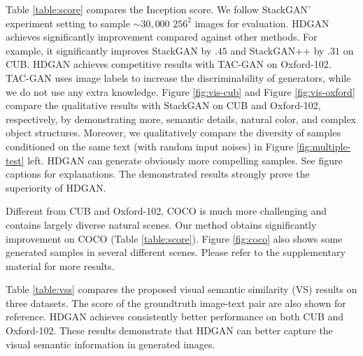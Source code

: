 \documentclass[10pt,twocolumn,letterpaper]{article}
\begin{document}
Table \ref{table:score} compares the Inception score. We follow StackGAN' experiment setting to sample ${\sim}30,000$ $256^2$ images for evaluation.
HDGAN achieves significantly improvement compared against other methods. For example, it significantly improves StackGAN by $.45$ and StackGAN++ by $.31$ on CUB.
HDGAN achieves competitive results with TAC-GAN on Oxford-102. TAC-GAN uses image labels to increase the discriminability of generators, while we do not use any extra knowledge. Figure \ref{fig:vis-cub} and Figure \ref{fig:vis-oxford} compare the qualitative results with StackGAN on CUB and Oxford-102, respectively, by demonstrating more, semantic details, natural color, and complex object structures. 
Moreover, we qualitatively compare the diversity of samples conditioned on the same text (with random input noises) in Figure \ref{fig:multiple-test} left. HDGAN can generate obviously more compelling samples. See figure captions for explanations. The demonstrated results strongly prove the superiority of HDGAN. 

Different from CUB and Oxford-102, COCO is much more challenging and contains largely diverse natural scenes. 
Our method obtains significantly improvement on COCO (Table \ref{table:score}). 
Figure \ref{fig:coco} also shows some generated samples in several different scenes.
Please refer to the supplementary material for more results. 


Table \ref{table:vss} compares the proposed visual semantic similarity (VS) results on three datasets. The score of the groundtruth image-text pair are also shown for reference.  HDGAN achieves consistently better performance on both CUB and Oxford-102. These results demonstrate that HDGAN can better capture the visual semantic information in generated images. 


\end{document}
